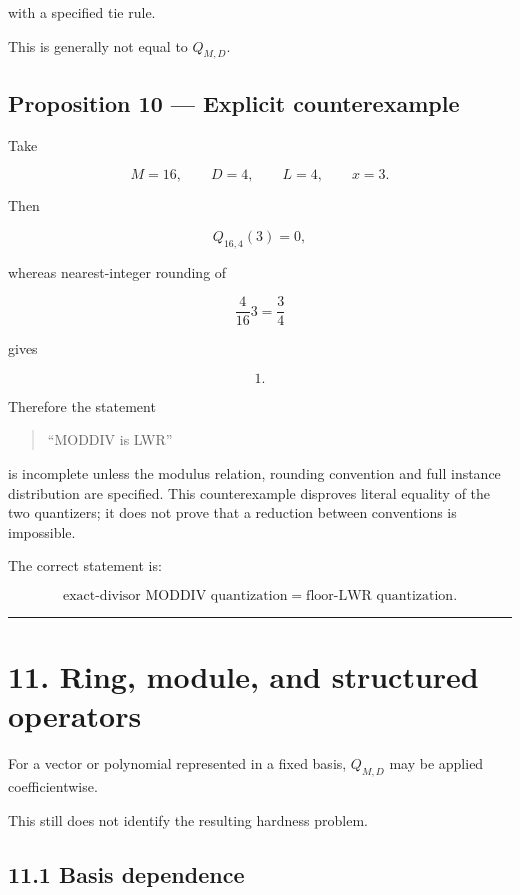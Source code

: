 \documentclass[11pt,a4paper]{article}
\begin{document}
with a specified tie rule.

This is generally not equal to \(Q_{M,D}\).

\subsection{Proposition 10 --- Explicit counterexample}\label{proposition-10-explicit-counterexample}

Take

\[
M=16,\qquad D=4,\qquad L=4,\qquad x=3.
\]

Then

\[
Q_{16,4}(3)=0,
\]

whereas nearest-integer rounding of

\[
\frac{4}{16}3=\frac34
\]

gives

\[
1.
\]

Therefore the statement

\begin{quote}
``MODDIV is LWR''
\end{quote}

is incomplete unless the modulus relation, rounding convention and full instance distribution are specified. This counterexample disproves literal equality of the two quantizers; it does not prove that a reduction between conventions is impossible.

The correct statement is:

\[
\boxed{
\text{exact-divisor MODDIV quantization}
=
\text{floor-LWR quantization}.
}
\]

\begin{center}\rule{0.5\linewidth}{0.5pt}\end{center}

\section{11. Ring, module, and structured operators}\label{ring-module-and-structured-operators}

For a vector or polynomial represented in a fixed basis, \(Q_{M,D}\) may be applied coefficientwise.

This still does not identify the resulting hardness problem.

\subsection{11.1 Basis dependence}\label{basis-dependence}
\end{document}
